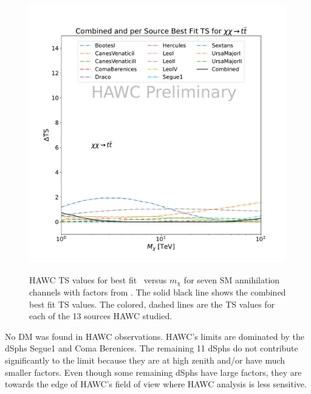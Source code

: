 \begin{figure}[t]
{        \includegraphics[scale=0.21]{figures/glory_duck/hawc/CombinedTS_data_tt_.pdf}
    }
    \caption{HAWC TS values for best fit \sv~versus $m_\chi$ for seven SM annihilation channels with \J factors from \GS. The solid black line shows the combined best fit TS values. The colored, dashed lines are the TS values for each of the 13 sources HAWC studied.}\label{fig:gd_HAWC_TS}
\end{figure}

No DM was found in HAWC observations.
HAWC's limits are dominated by the dSphs Segue1 and Coma Berenices.
The remaining 11 dSphs do not contribute significantly to the limit because they are at high zenith and/or have much smaller \J factors.
Even though some remaining dSphs have large \J factors, they are towards the edge of HAWC's field of view where HAWC analysis is less sensitive.

